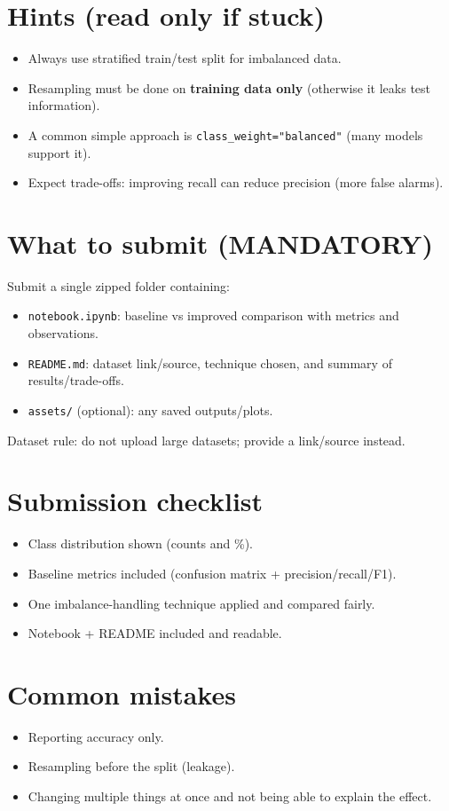 \documentclass[11pt]{article}
\begin{document}
\section{Hints (read only if stuck)}
\begin{itemize}[leftmargin=*]
  \item Always use stratified train/test split for imbalanced data.
  \item Resampling must be done on \textbf{training data only} (otherwise it leaks test information).
  \item A common simple approach is \texttt{class\_weight="balanced"} (many models support it).
  \item Expect trade-offs: improving recall can reduce precision (more false alarms).
\end{itemize}

\section{What to submit (MANDATORY)}
Submit a single zipped folder containing:
\begin{itemize}[leftmargin=*]
  \item \texttt{notebook.ipynb}: baseline vs improved comparison with metrics and observations.
  \item \texttt{README.md}: dataset link/source, technique chosen, and summary of results/trade-offs.
  \item \texttt{assets/} (optional): any saved outputs/plots.
\end{itemize}
Dataset rule: do not upload large datasets; provide a link/source instead.

\section{Submission checklist}
\begin{itemize}[leftmargin=*]
  \item Class distribution shown (counts and \%).
  \item Baseline metrics included (confusion matrix + precision/recall/F1).
  \item One imbalance-handling technique applied and compared fairly.
  \item Notebook + README included and readable.
\end{itemize}

\section{Common mistakes}
\begin{itemize}[leftmargin=*]
  \item Reporting accuracy only.
  \item Resampling before the split (leakage).
  \item Changing multiple things at once and not being able to explain the effect.
\end{itemize}

\notesources{\AIMLLabSources}
\end{document}
